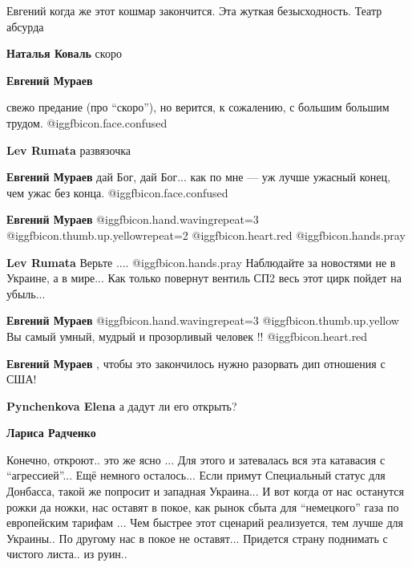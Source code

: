  
 
 
 
 
\zzSecCmt

\begin{itemize} %
Евгений когда же этот кошмар закончится. Эта жуткая безысходность. Театр абсурда

\begin{itemize} %
\textbf{Наталья Коваль} скоро

\textbf{Евгений Мураев} 

свежо предание (про \enquote{скоро}), но верится, к сожалению,
с большим большим трудом.  @igg{fbicon.face.confused} 


\textbf{Lev Rumata} развязочка

\textbf{Евгений Мураев} дай Бог, дай Бог...
как по мне — уж лучше ужасный конец, чем ужас без конца.  @igg{fbicon.face.confused} 

\textbf{Евгений Мураев}  @igg{fbicon.hand.waving}{repeat=3}  @igg{fbicon.thumb.up.yellow}{repeat=2} @igg{fbicon.heart.red} @igg{fbicon.hands.pray} 

\textbf{Lev Rumata} Верьте ....  @igg{fbicon.hands.pray}  Наблюдайте за новостями не в Украине, а в мире...
Как только повернут вентиль СП2 весь этот цирк пойдет на убыль...

\textbf{Евгений Мураев}  @igg{fbicon.hand.waving}{repeat=3}  @igg{fbicon.thumb.up.yellow}  Вы самый умный, мудрый и прозорливый человек !! @igg{fbicon.heart.red}

\textbf{Евгений Мураев} , чтобы это закончилось нужно разорвать дип отношения с США!

\textbf{Pynchenkova Elena} а дадут ли его открыть?

\textbf{Лариса Радченко} 

Конечно, откроют.. это же ясно ... Для этого и затевалась вся эта катавасия с
\enquote{агрессией}... Ещё немного осталось... Если примут Специальный статус для
Донбасса, такой же попросит и западная Украина... И вот когда от нас останутся
рожки да ножки, нас оставят в покое, как рынок сбыта для \enquote{немецкого} газа по
европейским тарифам ... Чем быстрее этот сценарий реализуется, тем лучше для
Украины.. По другому нас в покое не оставят... Придется страну поднимать с
чистого листа.. из руин..


\end{itemize}
\end{itemize}
